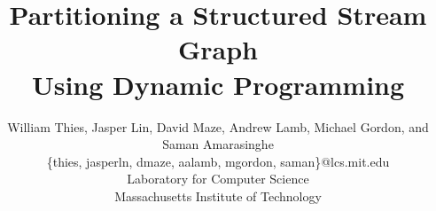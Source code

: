 \documentclass{sig-alternate}
\title{Partitioning a Structured Stream Graph \\ Using Dynamic Programming}
\author{
\alignauthor \vspace{-18pt}
William Thies,
Jasper Lin,
David Maze,
Andrew Lamb, 
Michael Gordon, and 
Saman Amarasinghe \\
	\vspace{8pt}
	\{thies, jasperln, dmaze, aalamb, mgordon, saman\}@lcs.mit.edu \\
	\vspace{8pt}
	Laboratory for Computer Science \\
	Massachusetts Institute of Technology}
\begin{document}
\newtheorem{definition}{Definition}
\newtheorem{transformation}{Transformation}

\maketitle

\newcommand{\mt}[1]{\mbox{\it #1}}
\newcommand{\todo}[1]{\framebox{\bf #1}}

\begin{abstract}

\end{abstract}








\begin{small}
  
  
\end{small}
\end{document}
